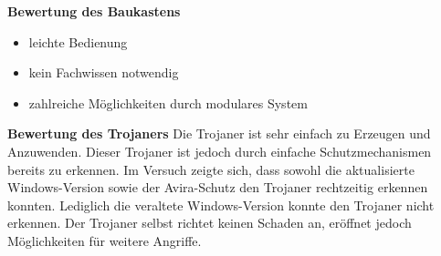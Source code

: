 \textbf{Bewertung des Baukastens} 
	\begin{itemize}
		\item leichte Bedienung
		\item kein Fachwissen notwendig
		\item zahlreiche Möglichkeiten durch modulares System
	\end{itemize}

\textbf{Bewertung des Trojaners}
Die Trojaner ist sehr einfach zu Erzeugen und Anzuwenden. 
Dieser Trojaner ist jedoch durch einfache Schutzmechanismen bereits zu erkennen.
Im Versuch zeigte sich, dass sowohl die aktualisierte Windows-Version sowie der Avira-Schutz den Trojaner rechtzeitig erkennen konnten.
Lediglich die veraltete Windows-Version konnte den Trojaner nicht erkennen. 
Der Trojaner selbst richtet keinen Schaden an, eröffnet jedoch Möglichkeiten für weitere Angriffe.
